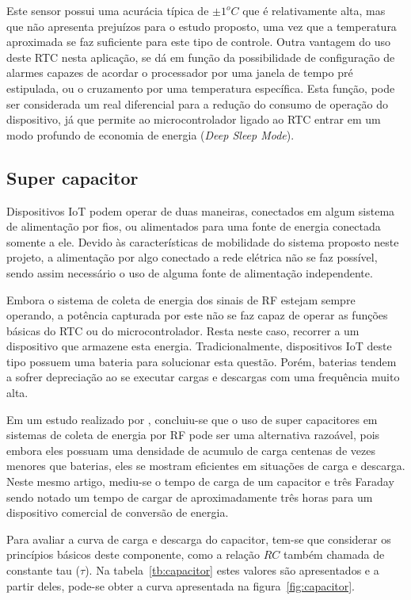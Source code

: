 Este sensor possui uma acurácia típica de $\pm 1^oC$ que é relativamente alta, mas que não apresenta prejuízos para o estudo proposto, uma vez que a temperatura aproximada se faz suficiente para este tipo de controle.
Outra vantagem do uso deste RTC nesta aplicação, se dá em função da possibilidade de configuração de alarmes capazes de acordar o processador por uma janela de tempo pré estipulada, ou o cruzamento por uma temperatura específica. Esta função, pode ser considerada um real diferencial para a redução do consumo de operação do dispositivo, já que permite ao microcontrolador ligado ao RTC entrar em um modo profundo de economia de energia (\textit{Deep Sleep Mode}).

\subsection{Super capacitor}
Dispositivos IoT podem operar de duas maneiras, conectados em algum sistema de alimentação por fios, ou alimentados para uma fonte de energia conectada somente a ele. Devido às características de mobilidade do sistema proposto neste projeto, a alimentação por algo conectado a rede elétrica não se faz possível, sendo assim necessário o uso de alguma fonte de alimentação independente.

Embora o sistema de coleta de energia dos sinais de RF estejam sempre operando, a potência capturada por este não se faz capaz de operar as funções básicas do RTC ou do microcontrolador.
Resta neste caso, recorrer a um dispositivo que armazene esta energia. Tradicionalmente, dispositivos IoT deste tipo possuem uma bateria para solucionar esta questão. Porém, baterias tendem a sofrer depreciação ao se executar cargas e descargas com uma frequência muito alta. 

Em um estudo realizado por , concluiu-se que o uso de super capacitores em sistemas de coleta de energia por RF pode ser uma alternativa razoável, pois embora eles possuam uma densidade de acumulo de carga centenas de vezes menores que baterias, eles se mostram eficientes em situações de carga e descarga. Neste mesmo artigo, mediu-se o tempo de carga de um capacitor e três Faraday sendo notado um tempo de cargar de aproximadamente três horas para um dispositivo comercial de conversão de energia.

Para avaliar a curva de carga e descarga do capacitor, tem-se que considerar os princípios básicos deste componente, como a relação $RC$ também chamada de constante tau ($\tau$). Na tabela~\ref{tb:capacitor} estes valores são apresentados e a partir deles, pode-se obter a curva apresentada na figura~\ref{fig:capacitor}.

